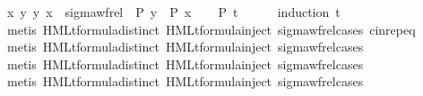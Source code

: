 \begin{isabellebody}
\ {\isacartoucheopen}{\isasymforall}x{\isachardot}{\kern0pt}\ {\isacharparenleft}{\kern0pt}{\isasymforall}y{\isachardot}{\kern0pt}\ {\isacharparenleft}{\kern0pt}y{\isacharcomma}{\kern0pt}\ x{\isacharparenright}{\kern0pt}\ {\isasymin}\ sigma{\isacharunderscore}{\kern0pt}wf{\isacharunderscore}{\kern0pt}rel\ {\isasymlongrightarrow}\ P\ y{\isacharparenright}{\kern0pt}\ {\isasymlongrightarrow}\ P\ x{\isacartoucheclose}\isanewline
\ \ \isamarkupfalse%
\ {\isacartoucheopen}P\ t{\isacartoucheclose}\isanewline
\ \ \ \ \isamarkupfalse%
\ {\isacharparenleft}{\kern0pt}induction\ t{\isacharparenright}{\kern0pt}\isanewline
\ \ \ \ \isamarkupfalse%
\ {\isacharparenleft}{\kern0pt}metis\ HMLt{\isacharunderscore}{\kern0pt}formula{\isachardot}{\kern0pt}distinct{\isacharparenleft}{\kern0pt}{}{\isacharcomma}{\kern0pt}{}{\isacharcomma}{\kern0pt}{}{\isacharparenright}{\kern0pt}\ HMLt{\isacharunderscore}{\kern0pt}formula{\isachardot}{\kern0pt}inject{\isacharparenleft}{\kern0pt}{}{\isacharparenright}{\kern0pt}\ sigma{\isacharunderscore}{\kern0pt}wf{\isacharunderscore}{\kern0pt}rel{\isachardot}{\kern0pt}cases\ cin{\isachardot}{\kern0pt}rep{\isacharunderscore}{\kern0pt}eq{\isacharparenright}{\kern0pt}\isanewline
\ \ \ \ \isamarkupfalse%
\ {\isacharparenleft}{\kern0pt}metis\ HMLt{\isacharunderscore}{\kern0pt}formula{\isachardot}{\kern0pt}distinct{\isacharparenleft}{\kern0pt}{}{\isacharcomma}{\kern0pt}{}{\isacharcomma}{\kern0pt}{}{}{\isacharparenright}{\kern0pt}\ HMLt{\isacharunderscore}{\kern0pt}formula{\isachardot}{\kern0pt}inject{\isacharparenleft}{\kern0pt}{}{\isacharparenright}{\kern0pt}\ sigma{\isacharunderscore}{\kern0pt}wf{\isacharunderscore}{\kern0pt}rel{\isachardot}{\kern0pt}cases{\isacharparenright}{\kern0pt}\isanewline
\ \ \ \ \isamarkupfalse%
\ {\isacharparenleft}{\kern0pt}metis\ HMLt{\isacharunderscore}{\kern0pt}formula{\isachardot}{\kern0pt}distinct{\isacharparenleft}{\kern0pt}{}{\isacharcomma}{\kern0pt}{}{\isacharcomma}{\kern0pt}{}{}{\isacharparenright}{\kern0pt}\ HMLt{\isacharunderscore}{\kern0pt}formula{\isachardot}{\kern0pt}inject{\isacharparenleft}{\kern0pt}{}{\isacharparenright}{\kern0pt}\ sigma{\isacharunderscore}{\kern0pt}wf{\isacharunderscore}{\kern0pt}rel{\isachardot}{\kern0pt}cases{\isacharparenright}{\kern0pt}\isanewline
\ \ \ \ \isamarkupfalse%
\ {\isacharparenleft}{\kern0pt}metis\ HMLt{\isacharunderscore}{\kern0pt}formula{\isachardot}{\kern0pt}distinct{\isacharparenleft}{\kern0pt}{}{\isacharcomma}{\kern0pt}{}{\isacharcomma}{\kern0pt}{}{}{\isacharparenright}{\kern0pt}\ HMLt{\isacharunderscore}{\kern0pt}formula{\isachardot}{\kern0pt}inject{\isacharparenleft}{\kern0pt}{}{\isacharparenright}{\kern0pt}\ sigma{\isacharunderscore}{\kern0pt}wf{\isacharunderscore}{\kern0pt}rel{\isachardot}{\kern0pt}cases{\isacharparenright}{\kern0pt}\isanewline

\end{isabellebody}
